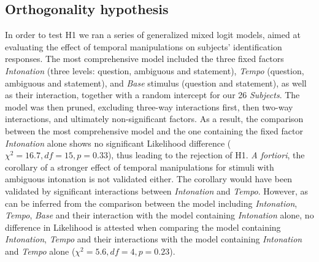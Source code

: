 \subsection{Orthogonality hypothesis}\label{sec531}
In order to test H1 we ran a series of generalized mixed logit models, aimed at evaluating the effect of temporal manipulations on subjects' identification responses. The most comprehensive model included the three fixed factors \textit{Intonation} (three levels: question, ambiguous and statement), \textit{Tempo} (question, ambiguous and statement), and \textit{Base} stimulus (question and statement), as well as their interaction, together with a random intercept for our 26 \textit{Subjects}. The model was then pruned, excluding three-way interactions first, then two-way interactions, and ultimately non-significant factors. As a result, the comparison between the most comprehensive model and the one containing the fixed factor \textit{Intonation} alone shows no significant Likelihood difference ($\chi^{2}=16.7, df=15, p=0.33$), thus leading to the rejection of H1.
\textit{A fortiori}, the corollary of a stronger effect of temporal manipulations for stimuli with ambiguous intonation is not validated either. The corollary would have been validated by significant interactions between \textit{Intonation} and \textit{Tempo}. However, as can be inferred from the comparison between the model including \textit{Intonation}, \textit{Tempo}, \textit{Base} and their interaction with the model containing \textit{Intonation} alone, no difference in Likelihood is attested when comparing the model containing \textit{Intonation}, \textit{Tempo} and their interactions with the model containing \textit{Intonation} and \textit{Tempo} alone ($\chi^{2}=5.6, df=4, p=0.23$).
